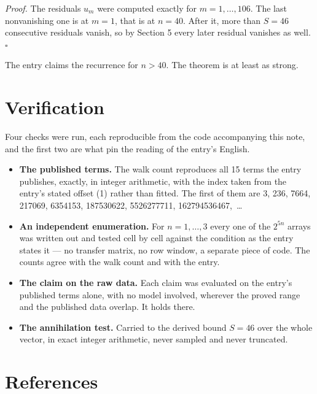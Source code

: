 \documentclass[11pt]{article}
\theoremstyle{definition}
\begin{document}
{\itshape Proof.} The residuals $u_m$ were computed exactly for $m = 1,\dots,106$. The last nonvanishing one is at $m = 1$, that is at $n = 40$. After it, more than $S = 46$ consecutive residuals vanish, so by Section 5 every later residual vanishes as well. $\square$

The entry claims the recurrence for $n > 40$. The theorem is at least as strong.

\section{Verification}

Four checks were run, each reproducible from the code accompanying this note, and the first two are what pin the reading of the entry's English.

\begin{itemize}

\item {\bfseries The published terms.} The walk count reproduces all 15 terms the entry publishes, exactly, in integer arithmetic, with the index taken from the entry's stated offset (1) rather than fitted. The first of them are 3, 236, 7664, 217069, 6354153, 187530622, 5526277711, 162794536467,~\dots

\item {\bfseries An independent enumeration.} For $n = 1,\dots,3$ every one of the $2^{5n}$ arrays was written out and tested cell by cell against the condition as the entry states it --- no transfer matrix, no row window, a separate piece of code. The counts agree with the walk count and with the entry.

\item {\bfseries The claim on the raw data.} Each claim was evaluated on the entry's published terms alone, with no model involved, wherever the proved range and the published data overlap. It holds there.

\item {\bfseries The annihilation test.} Carried to the derived bound $S = 46$ over the whole vector, in exact integer arithmetic, never sampled and never truncated.

\end{itemize}

\section{References}
\end{document}
